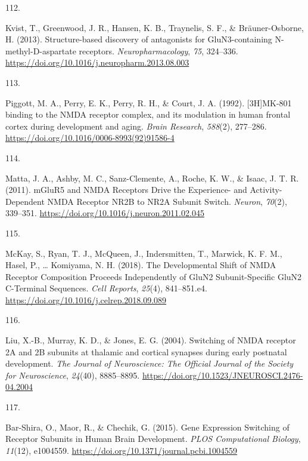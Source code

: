 \documentclass[
  11pt,
  letterpaper,
]{scrreprt}
\newlength{\cslhangindent}
\newlength{\csllabelwidth}
\newenvironment{CSLReferences}[2] %
 {\begin{list}{}{%
  \setlength{\itemindent}{0pt}
  \setlength{\leftmargin}{0pt}
  \setlength{\parsep}{0pt}
  \ifodd #1
   \setlength{\leftmargin}{\cslhangindent}
   \setlength{\itemindent}{-1\cslhangindent}
  \fi
  \setlength{\itemsep}{#2\baselineskip}}}
 {\end{list}}
\newcommand{\CSLLeftMargin}[1]{\parbox[t]{\csllabelwidth}{\strut#1\strut}}
\newcommand{\CSLRightInline}[1]{\parbox[t]{\linewidth - \csllabelwidth}{\strut#1\strut}}
\begin{document}
\begin{CSLReferences}{0}{0}
\CSLLeftMargin{112. }%
\CSLRightInline{Kvist, T., Greenwood, J. R., Hansen, K. B., Traynelis,
S. F., \& Bräuner-Osborne, H. (2013). Structure-based discovery of
antagonists for {GluN3-containing N-methyl-D-aspartate} receptors.
\emph{Neuropharmacology}, \emph{75}, 324--336.
\url{https://doi.org/10.1016/j.neuropharm.2013.08.003}}

\CSLLeftMargin{113. }%
\CSLRightInline{Piggott, M. A., Perry, E. K., Perry, R. H., \& Court, J.
A. (1992). {[}{3H}{]}{MK-801} binding to the {NMDA} receptor complex,
and its modulation in human frontal cortex during development and aging.
\emph{Brain Research}, \emph{588}(2), 277--286.
\url{https://doi.org/10.1016/0006-8993(92)91586-4}}

\CSLLeftMargin{114. }%
\CSLRightInline{Matta, J. A., Ashby, M. C., Sanz-Clemente, A., Roche, K.
W., \& Isaac, J. T. R. (2011). {mGluR5} and {NMDA Receptors Drive} the
{Experience-} and {Activity-Dependent NMDA Receptor NR2B} to {NR2A
Subunit Switch}. \emph{Neuron}, \emph{70}(2), 339--351.
\url{https://doi.org/10.1016/j.neuron.2011.02.045}}

\CSLLeftMargin{115. }%
\CSLRightInline{McKay, S., Ryan, T. J., McQueen, J., Indersmitten, T.,
Marwick, K. F. M., Hasel, P., \ldots{} Komiyama, N. H. (2018). The
{Developmental Shift} of {NMDA Receptor Composition Proceeds
Independently} of {GluN2 Subunit-Specific GluN2 C-Terminal Sequences}.
\emph{Cell Reports}, \emph{25}(4), 841--851.e4.
\url{https://doi.org/10.1016/j.celrep.2018.09.089}}

\CSLLeftMargin{116. }%
\CSLRightInline{Liu, X.-B., Murray, K. D., \& Jones, E. G. (2004).
Switching of {NMDA} receptor {2A} and {2B} subunits at thalamic and
cortical synapses during early postnatal development. \emph{The Journal
of Neuroscience: The Official Journal of the Society for Neuroscience},
\emph{24}(40), 8885--8895.
\url{https://doi.org/10.1523/JNEUROSCI.2476-04.2004}}

\CSLLeftMargin{117. }%
\CSLRightInline{Bar-Shira, O., Maor, R., \& Chechik, G. (2015). Gene
{Expression Switching} of {Receptor Subunits} in {Human Brain
Development}. \emph{PLOS Computational Biology}, \emph{11}(12),
e1004559. \url{https://doi.org/10.1371/journal.pcbi.1004559}}


\end{CSLReferences}
\end{document}
